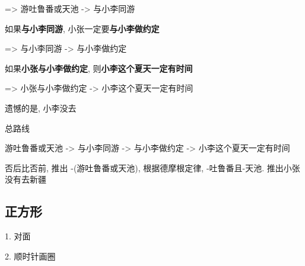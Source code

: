 => 游吐鲁番或天池 -> 与小李同游

如果\textbf{与小李同游}, 小张一定要\textbf{与小李做约定}

=> 与小李同游 -> 与小李做约定

如果\textbf{小张与小李做约定}, 则\textbf{小李这个夏天一定有时间}

=> 小张与小李做约定 -> 小李这个夏天一定有时间

遗憾的是, 小李没去

总路线

游吐鲁番或天池 -> 与小李同游 -> 与小李做约定 -> 小李这个夏天一定有时间

否后比否前, 推出 -(游吐鲁番或天池), 根据德摩根定律, -吐鲁番且-天池. 推出小张没有去新疆

\subsection{正方形}

1. 对面

2. 顺时针画圈

